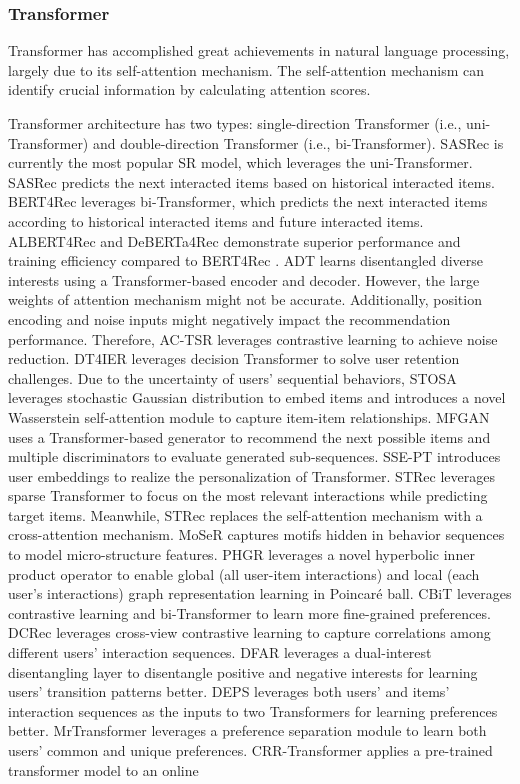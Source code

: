 \documentclass[review]{fcs}
\begin{document}
	\subsubsection{Transformer}
	Transformer has accomplished great achievements in natural language processing, largely due to its self-attention mechanism. The self-attention mechanism can identify crucial information by calculating attention scores.
	
	Transformer architecture has two types: single-direction Transformer (i.e., uni-Transformer) and double-direction Transformer (i.e., bi-Transformer). SASRec \cite{SASRec} is currently the most popular SR model, which leverages the uni-Transformer. SASRec predicts the next interacted items based on historical interacted items. BERT4Rec \cite{BERT4Rec} leverages bi-Transformer, which predicts the next interacted items according to historical interacted items and future interacted items. ALBERT4Rec and DeBERTa4Rec \cite{ALBERT4Rec_DeBERTa4Rec} demonstrate superior performance and training efficiency compared to BERT4Rec \cite{BERT4Rec}. ADT \cite{ADT} learns disentangled diverse interests using a Transformer-based encoder and decoder. However, the large weights of attention mechanism might not be accurate. Additionally, position encoding and noise inputs might negatively impact the recommendation performance. Therefore, AC-TSR \cite{AC-TSR} leverages contrastive learning to achieve noise reduction. DT4IER \cite{DT4IER} leverages decision Transformer to solve user retention challenges. Due to the uncertainty of users’ sequential behaviors, STOSA \cite{STOSA} leverages stochastic Gaussian distribution to embed items and introduces a novel Wasserstein self-attention module to capture item-item relationships. MFGAN \cite{MFGAN} uses a Transformer-based generator to recommend the next possible items and multiple discriminators to evaluate generated sub-sequences. SSE-PT \cite{SSE-PT} introduces user embeddings to realize the personalization of Transformer. STRec \cite{STRec} leverages sparse Transformer to focus on the most relevant interactions while predicting target items. Meanwhile, STRec \cite{STRec} replaces the self-attention mechanism with a cross-attention mechanism. MoSeR \cite{MoSeR} captures motifs hidden in behavior sequences to model micro-structure features. PHGR \cite{PHGR} leverages a novel hyperbolic inner product operator  to enable global (all user-item interactions) and local (each user’s interactions) graph representation learning in Poincaré ball. CBiT \cite{CBiT} leverages contrastive learning and bi-Transformer to learn more fine-grained preferences. DCRec \cite{DCRec} leverages cross-view contrastive learning to capture correlations among different users' interaction sequences. DFAR \cite{DFAR} leverages a dual-interest disentangling layer to disentangle positive and negative interests for learning users’ transition patterns better. DEPS \cite{DEPS} leverages both users’ and items' interaction sequences as the inputs to two Transformers for learning preferences better. MrTransformer \cite{MrTransformer} leverages a preference separation module to learn both users’ common and unique preferences. CRR-Transformer \cite{CRR-Transformer} applies a pre-trained transformer model to an online 
\end{document}
